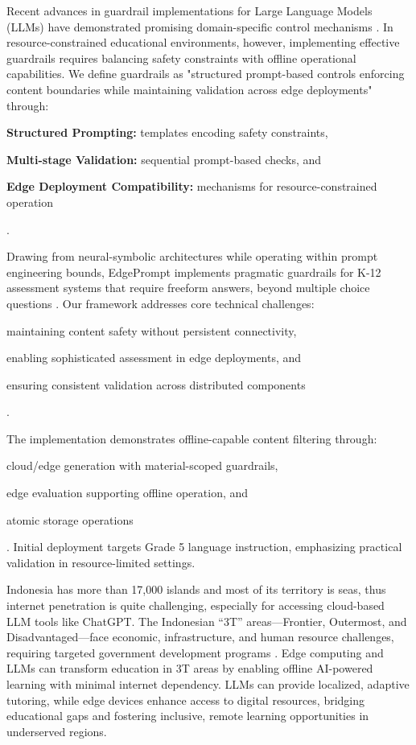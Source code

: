 \documentclass[sigconf]{acmart}
\begin{document}
Recent advances in guardrail implementations for Large Language Models (LLMs) have demonstrated promising domain-specific control mechanisms  \cite{dong_building_2024, dong_safeguarding_2024}. In resource-constrained educational environments, however, implementing effective guardrails requires balancing safety constraints with offline operational capabilities. We define guardrails as "structured prompt-based controls enforcing content boundaries while maintaining validation across edge deployments" through:
\begin{enumerate*}
    \item \textbf{Structured Prompting:} templates encoding safety constraints,
    \item \textbf{Multi-stage Validation:} sequential prompt-based checks, and
    \item \textbf{Edge Deployment Compatibility:} mechanisms for resource-constrained operation
\end{enumerate*}.

Drawing from neural-symbolic architectures \cite{dong_safeguarding_2024} while operating within prompt engineering bounds, EdgePrompt implements pragmatic guardrails for K-12 assessment systems that require freeform answers, beyond multiple choice questions \cite{hang_mcqgen_2024}. Our framework addresses core technical challenges:
\begin{enumerate*}
    \item maintaining content safety without persistent connectivity,
    \item enabling sophisticated assessment in edge deployments, and
    \item ensuring consistent validation across distributed components
\end{enumerate*}.

The implementation demonstrates offline-capable content filtering through:
\begin{enumerate*}
    \item cloud/edge generation with material-scoped guardrails,
    \item edge evaluation supporting offline operation, and
    \item atomic storage operations
\end{enumerate*}.
Initial deployment targets Grade 5 language instruction, emphasizing practical validation in resource-limited settings.

Indonesia has more than 17,000 islands and most of its territory is seas, thus internet penetration is quite challenging, especially for accessing cloud-based LLM tools like ChatGPT. The Indonesian “3T” areas—Frontier, Outermost, and Disadvantaged—face economic, infrastructure, and human resource challenges, requiring targeted government development programs \cite{kementerian_desa_official_2025, noauthor_peraturan_2020}. Edge computing and LLMs can transform education in 3T areas by enabling offline AI-powered learning with minimal internet dependency. LLMs can provide localized, adaptive tutoring, while edge devices enhance access to digital resources, bridging educational gaps and fostering inclusive, remote learning opportunities in underserved regions.
\end{document}
